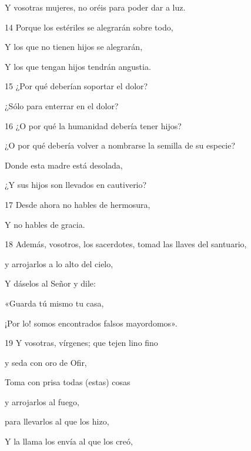 Y vosotras mujeres, no oréis para poder dar a luz.

\par 14 Porque los estériles se alegrarán sobre todo,

Y los que no tienen hijos se alegrarán,

Y los que tengan hijos tendrán angustia.

\par 15 ¿Por qué deberían soportar el dolor?

\par ¿Sólo para enterrar en el dolor?

\par 16 ¿O por qué la humanidad debería tener hijos?

\par ¿O por qué debería volver a nombrarse la semilla de su especie?

\par Donde esta madre está desolada,

\par ¿Y sus hijos son llevados en cautiverio?

\par 17 Desde ahora no hables de hermosura,

\par Y no hables de gracia.

\par 18 Además, vosotros, los sacerdotes, tomad las llaves del santuario,

y arrojarlos a lo alto del cielo,

\par Y dáselos al Señor y dile:

\par «Guarda tú mismo tu casa,

\par ¡Por lo! somos encontrados falsos mayordomos».

\par 19 Y vosotras, vírgenes; que tejen lino fino

y seda con oro de Ofir,

\par Toma con prisa todas (estas) cosas

\par y arrojarlos al fuego,

para llevarlos al que los hizo,

\par Y la llama los envía al que los creó,

